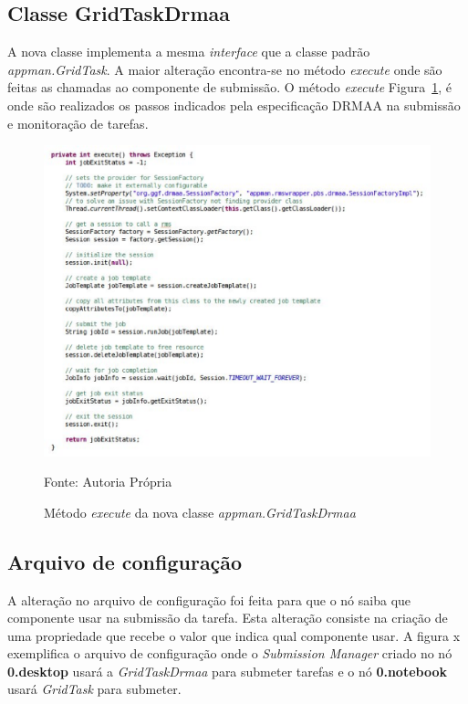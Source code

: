 \subsection{Classe GridTaskDrmaa}

A nova classe implementa a mesma \emph{interface} que a classe padrão \emph{appman.GridTask}. A maior alteração encontra-se no método \emph{execute} onde são feitas as chamadas ao componente de submissão. O método \emph{execute} Figura~\ref{fig:execute}, é onde são realizados os passos indicados pela especificação DRMAA na submissão e monitoração de tarefas.

\begin{figure}[htb]
\begin{center}
\includegraphics[scale=0.65]{./img/execute.eps}
\caption{Método \emph{execute} da nova classe \emph{appman.GridTaskDrmaa}}
\label{fig:execute}
Fonte: Autoria Própria
\end{center}
\end{figure}

\subsection{Arquivo de configuração}

A alteração no arquivo de configuração foi feita para que o nó saiba que componente usar na submissão da tarefa. Esta alteração consiste na criação de uma propriedade que recebe o valor que indica qual componente usar. A figura x exemplifica o arquivo de configuração onde o \emph{Submission Manager} criado no nó \textbf{0.desktop} usará a \emph{GridTaskDrmaa} para submeter tarefas e o nó \textbf{0.notebook} usará \emph{GridTask} para submeter.

